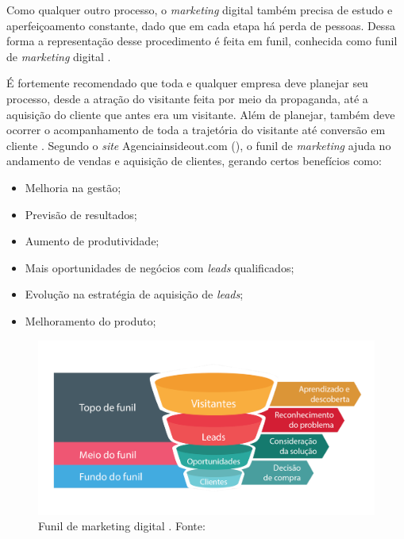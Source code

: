 Como qualquer outro processo, o \textit{marketing} digital também precisa de estudo e aperfeiçoamento constante, dado que em cada etapa há perda de pessoas. Dessa forma a representação desse procedimento é feita em funil, conhecida como funil de \textit{marketing} digital \cite{BORGES:2017}.

É fortemente recomendado que toda e qualquer empresa deve planejar seu processo, desde a atração do visitante feita por meio da propaganda, até a aquisição do cliente que antes era um visitante. Além de planejar, também deve ocorrer o acompanhamento de toda a trajetória do visitante até conversão em cliente \cite{INSIDEOUT:2018}.
Segundo o \textit{site} Agenciainsideout.com (\citeyear{INSIDEOUT:2018}), o funil de \textit{marketing} ajuda no andamento de vendas e aquisição de clientes, gerando certos benefícios como:

\begin{itemize}
    \item Melhoria na gestão;
    
    \item Previsão de resultados;
    
    \item Aumento de produtividade;
    
    \item Mais oportunidades de negócios com \textit{leads} qualificados;
    
    \item Evolução na estratégia de aquisição de \textit{leads};
    
    \item Melhoramento do produto;

\end{itemize}

\begin{figure}[H]
    \centering
    \includegraphics[scale=0.2]{figuras/referencial_teorico/funil_marketing.png}
    \caption[Funil de \textit{marketing} digital]{Funil de marketing digital . Fonte: \cite{INSIDEOUT:2018}}
    \label{fig:funil_marketing}
\end{figure}


